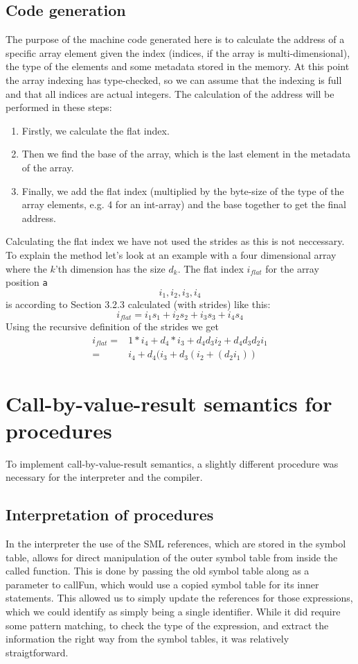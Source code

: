 \documentclass{article}
\begin{document}
\subsection{Code generation}
The purpose of the machine code generated here is to calculate the address of a specific array element given the index (indices, if the array is multi-dimensional), the type of the elements and some metadata stored in the memory. At this point the array indexing has type-checked, so we can assume that the indexing is full and that all indices are actual integers. The calculation of the address will be performed in these steps:
\begin{enumerate}
  \item Firstly, we calculate the flat index.
  \item Then we find the base of the array, which is the last element in the metadata of the array.
  \item Finally, we add the flat index (multiplied by the byte-size of the type of the array elements, e.g. 4 for an int-array) and the base together to get the final address.
\end{enumerate}
Calculating the flat index we have not used the strides as this is not neccessary. To explain the method let's look at an example with a four dimensional array where the $k$'th dimension has the size $d_k$. The flat index $i_{flat}$ for the array position \texttt{a\[i_1,i_2,i_3,i_4\]} is
according to Section 3.2.3 calculated (with strides) like this:
\begin{equation*}
i_{flat} = i_1 s_1 + i_2 s_2 + i_3 s_3 + i_4 s_4
\end{equation*}
Using the recursive definition of the strides we get
\begin{align*}
i_{flat} = & 1*i_4 + d_4*i_3 + d_4 d_3 i_2 + d_4 d_3 d_2 i_1 \\
       =  & i_4 + d_4 (i_3 + d_3 (i_2 + (d_2 i_1))
\end{align*}

\section{Call-by-value-result semantics for procedures}
To implement call-by-value-result semantics, a slightly different procedure was necessary
for the interpreter and the compiler. 

\subsection{Interpretation of procedures}
In the interpreter the use of the SML references,
which are stored in the symbol table, allows for direct manipulation of the outer symbol table from inside the called function.
This is done by passing the old symbol table along as a parameter to callFun, which would use a copied symbol table for its inner statements.
This allowed us to simply update the references for those expressions, which we could identify as simply being a single identifier.
While it did require some pattern matching, to check the type of the expression, and extract the information the right way
from the symbol tables, it was relatively straigtforward.
\end{document}
